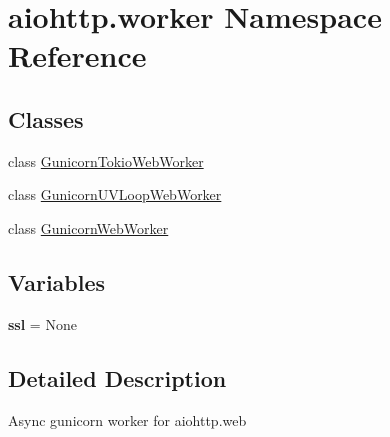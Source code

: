 \hypertarget{namespaceaiohttp_1_1worker}{}\section{aiohttp.\+worker Namespace Reference}
\label{namespaceaiohttp_1_1worker}
\subsection*{Classes}
\begin{DoxyCompactItemize}
\item 
class \hyperlink{classaiohttp_1_1worker_1_1_gunicorn_tokio_web_worker}{Gunicorn\+Tokio\+Web\+Worker}
\item 
class \hyperlink{classaiohttp_1_1worker_1_1_gunicorn_u_v_loop_web_worker}{Gunicorn\+U\+V\+Loop\+Web\+Worker}
\item 
class \hyperlink{classaiohttp_1_1worker_1_1_gunicorn_web_worker}{Gunicorn\+Web\+Worker}
\end{DoxyCompactItemize}
\subsection*{Variables}
\begin{DoxyCompactItemize}
\item 
\mbox{\label{namespaceaiohttp_1_1worker_ab11d1a691a88fc942a75cbe4f6ac1bbe}} 
{\bfseries ssl} = None
\end{DoxyCompactItemize}


\subsection{Detailed Description}
\begin{DoxyVerb}Async gunicorn worker for aiohttp.web\end{DoxyVerb}
 